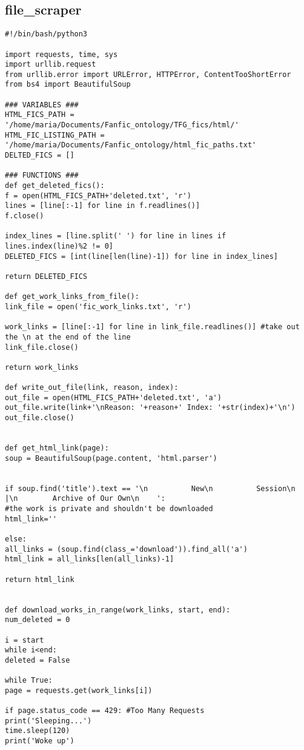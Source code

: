 \documentclass{pre-tfg}
\begin{document}
\subsection{file\_scraper}

\begin{lstlisting}[style=consola]
#!/bin/bash/python3

import requests, time, sys
import urllib.request
from urllib.error import URLError, HTTPError, ContentTooShortError
from bs4 import BeautifulSoup

### VARIABLES ###
HTML_FICS_PATH = '/home/maria/Documents/Fanfic_ontology/TFG_fics/html/'
HTML_FIC_LISTING_PATH = '/home/maria/Documents/Fanfic_ontology/html_fic_paths.txt'
DELTED_FICS = []

### FUNCTIONS ###
def get_deleted_fics():
f = open(HTML_FICS_PATH+'deleted.txt', 'r')
lines = [line[:-1] for line in f.readlines()]
f.close()

index_lines = [line.split(' ') for line in lines if lines.index(line)%2 != 0]
DELETED_FICS = [int(line[len(line)-1]) for line in index_lines]

return DELETED_FICS

def get_work_links_from_file():
link_file = open('fic_work_links.txt', 'r')

work_links = [line[:-1] for line in link_file.readlines()] #take out the \n at the end of the line
link_file.close()

return work_links 

def write_out_file(link, reason, index):
out_file = open(HTML_FICS_PATH+'deleted.txt', 'a')
out_file.write(link+'\nReason: '+reason+' Index: '+str(index)+'\n')
out_file.close()


def get_html_link(page):
soup = BeautifulSoup(page.content, 'html.parser')


if soup.find('title').text == '\n          New\n          Session\n        |\n        Archive of Our Own\n    ':
#the work is private and shouldn't be downloaded
html_link=''

else:				
all_links = (soup.find(class_='download')).find_all('a')
html_link = all_links[len(all_links)-1]

return html_link


def download_works_in_range(work_links, start, end):
num_deleted = 0

i = start
while i<end:
deleted = False

while True:		
page = requests.get(work_links[i])

if page.status_code == 429: #Too Many Requests
print('Sleeping...')
time.sleep(120)
print('Woke up')


\end{lstlisting}
\end{document}
